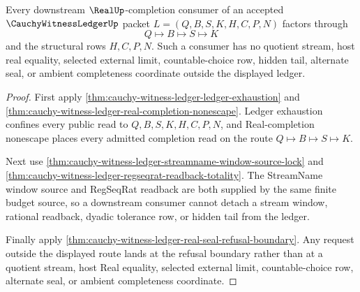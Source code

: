\begin{theorem}
\label{thm:cauchy-witness-ledger-root-consumer-exhaustion}
Every downstream $\RealUp$-completion consumer of an accepted $\CauchyWitnessLedgerUp$ packet $L=(Q,B,S,K,H,C,P,N)$ factors through
$$
Q \longmapsto B \longmapsto S \longmapsto K
$$
and the structural rows $H,C,P,N$. Such a consumer has no quotient stream, host real equality, selected external limit, countable-choice row, hidden tail, alternate seal, or ambient completeness coordinate outside the displayed ledger.
\end{theorem}
\begin{proof}
First apply \autoref{thm:cauchy-witness-ledger-ledger-exhaustion} and \autoref{thm:cauchy-witness-ledger-real-completion-nonescape}. Ledger exhaustion confines every public read to $Q,B,S,K,H,C,P,N$, and Real-completion nonescape places every admitted completion read on the route $Q \longmapsto B \longmapsto S \longmapsto K$.

Next use \autoref{thm:cauchy-witness-ledger-streamname-window-source-lock} and \autoref{thm:cauchy-witness-ledger-regseqrat-readback-totality}. The StreamName window source and RegSeqRat readback are both supplied by the same finite budget source, so a downstream consumer cannot detach a stream window, rational readback, dyadic tolerance row, or hidden tail from the ledger.

Finally apply \autoref{thm:cauchy-witness-ledger-real-seal-refusal-boundary}. Any request outside the displayed route lands at the refusal boundary rather than at a quotient stream, host Real equality, selected external limit, countable-choice row, alternate seal, or ambient completeness coordinate.
\end{proof}

